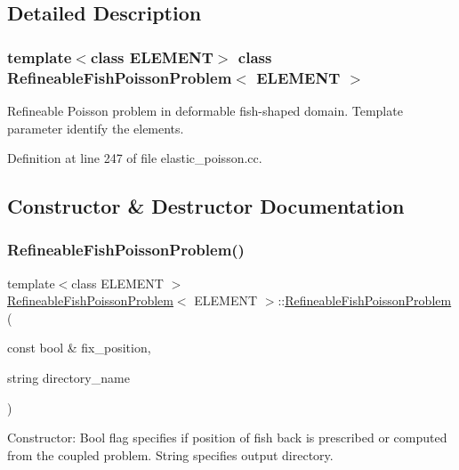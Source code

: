 \subsection{Detailed Description}
\subsubsection*{template$<$class E\+L\+E\+M\+E\+NT$>$\newline
class Refineable\+Fish\+Poisson\+Problem$<$ E\+L\+E\+M\+E\+N\+T $>$}

Refineable Poisson problem in deformable fish-\/shaped domain. Template parameter identify the elements. 

Definition at line 247 of file elastic\+\_\+poisson.\+cc.



\subsection{Constructor \& Destructor Documentation}
\mbox{\label{classRefineableFishPoissonProblem_a39da6bc93041c731bb3dc96b1d74c857}} 
\subsubsection{\texorpdfstring{Refineable\+Fish\+Poisson\+Problem()}{RefineableFishPoissonProblem()}}
{\footnotesize\ttfamily template$<$class E\+L\+E\+M\+E\+NT $>$ \\
\hyperlink{classRefineableFishPoissonProblem}{Refineable\+Fish\+Poisson\+Problem}$<$ E\+L\+E\+M\+E\+NT $>$\+::\hyperlink{classRefineableFishPoissonProblem}{Refineable\+Fish\+Poisson\+Problem} (\begin{DoxyParamCaption}\item[{const bool \&}]{fix\+\_\+position,  }\item[{string}]{directory\+\_\+name }\end{DoxyParamCaption})}



Constructor\+: Bool flag specifies if position of fish back is prescribed or computed from the coupled problem. String specifies output directory. 


